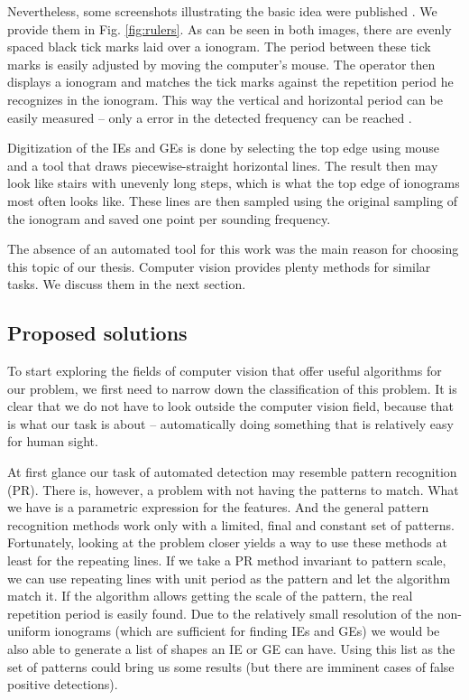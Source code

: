 Nevertheless, some screenshots illustrating the basic idea were published \citep{Duru2008, Akalin2010}. We provide them in Fig. \ref{fig:rulers}. As can be seen in both images, there are evenly spaced black tick marks laid over a ionogram. The period between these tick marks is easily adjusted by moving the computer's mouse. The operator then displays a ionogram and matches the tick marks against the repetition period he recognizes in the ionogram. This way the vertical and horizontal period can be easily measured -- only a  error in the detected frequency can be reached \citep[p.~2]{Duru2008}.

Digitization of the IEs and GEs is done by selecting the top edge using mouse and a tool that draws piecewise-straight horizontal lines. The result then may look like stairs with unevenly long steps, which is what the top edge of ionograms most often looks like. These lines are then sampled using the original sampling of the ionogram and saved one point per sounding frequency.

The absence of an automated tool for this work was the main reason for choosing this topic of our thesis. Computer vision provides plenty methods for similar tasks. We discuss them in the next section.

\subsection{Proposed solutions}
To start exploring the fields of computer vision that offer useful algorithms for our problem, we first need to narrow down the classification of this problem. It is clear that we do not have to look outside the computer vision field, because that is what our task is about -- automatically doing something that is relatively easy for human sight. 

At first glance our task of automated detection may resemble pattern recognition (PR). There is, however, a problem with not having the patterns to match. What we have is a parametric expression for the features. And the general pattern recognition methods work only with a limited, final and constant set of patterns. Fortunately, looking at the problem closer yields a way to use these methods at least for the repeating lines. If we take a PR method invariant to pattern scale, we can use repeating lines with unit period as the pattern and let the algorithm match it. If the algorithm allows getting the scale of the pattern, the real repetition period is easily found. Due to the relatively small resolution of the non-uniform ionograms (which are sufficient for finding IEs and GEs) we would be also able to generate a list of shapes an IE or GE can have. Using this list as the set of patterns could bring us some results (but there are imminent cases of false positive detections). 

